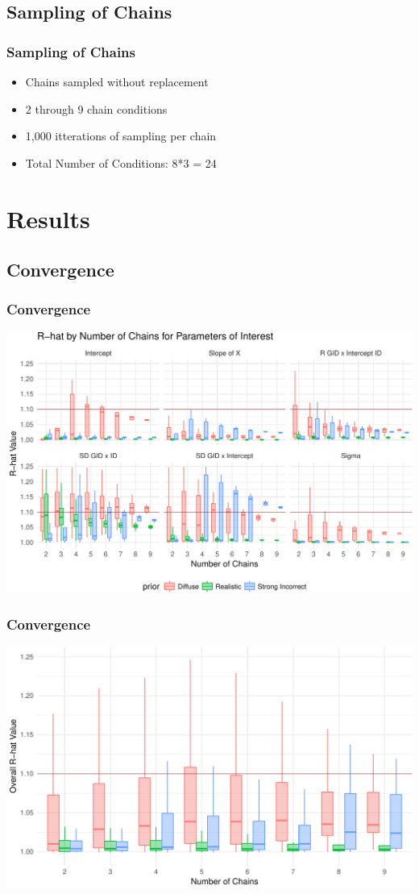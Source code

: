 \documentclass{beamer}
\begin{document}
\subsection{Sampling of Chains}

\begin{frame}
	\frametitle{Sampling of Chains}
\begin{itemize}
	\item Chains sampled without replacement
	\item 2 through 9 chain conditions
	\item 1,000 itterations of sampling per chain
	\item Total Number of Conditions: 8*3 = 24
\end{itemize}
\end{frame}


\section{Results}
\subsection{Convergence}
\begin{frame}
	\frametitle{Convergence}
	\includegraphics[scale=.57]{convergence_parm.pdf}
\end{frame}

\begin{frame}
	\frametitle{Convergence}
	\includegraphics[scale=.57]{convergence.pdf}
\end{frame}
\end{document}
